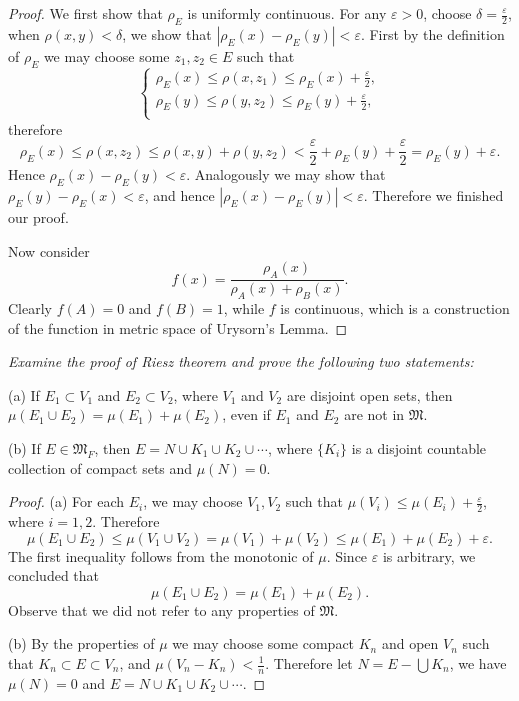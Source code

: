 \begin{proof}
We first show that $\rho_E$ is uniformly continuous. For any $\varepsilon>0$, choose $\delta=\frac{\varepsilon}{2}$, when $\rho(x,y)<\delta$, we show that $|\rho_E(x)-\rho_E(y)|<\varepsilon$. First by the definition of $\rho_E$ we may choose some $z_1,z_2\in E$ such that 
$$
\left\{ \begin{array}{c}
	\rho _E\left( x \right) \le \rho \left( x,z_1 \right) \le \rho _E\left( x \right) +\frac{\varepsilon}{2},\\
	\rho _E\left( y \right) \le \rho \left( y,z_2 \right) \le \rho _E\left( y \right) +\frac{\varepsilon}{2},\\
\end{array} \right. 
$$
therefore 
$$
\rho _E\left( x \right) \le \rho \left( x,z_2 \right) \le \rho \left( x,y \right) +\rho \left( y,z_2 \right) <\frac{\varepsilon}{2}+\rho _E\left( y \right) +\frac{\varepsilon}{2}=\rho _E\left( y \right) +\varepsilon .
$$
Hence $\rho_E(x)-\rho_E(y)<\varepsilon$. Analogously we may show that $\rho_E(y)-\rho_E(x)<\varepsilon$, and hence $|\rho_E(x)-\rho_E(y)|<\varepsilon$. Therefore we finished our proof.\par
Now consider 
$$f(x)=\frac{\rho_A(x)}{\rho_A(x)+\rho_B(x)}.$$
Clearly $f(A)=0$ and $f(B)=1$, while $f$ is continuous, which is a construction of the function in metric space of Urysorn's Lemma.
\end{proof}
\begin{problem}\em
Examine the proof of Riesz theorem and prove the following two statements:\par
(a) If $E_1\subset V_1$ and $E_2\subset V_2$, where $V_1$ and $V_2$ are disjoint open sets, then $\mu(E_1\cup E_2)=\mu(E_1)+\mu(E_2)$, even if $E_1$ and $E_2$ are not in $\mathfrak{M}$.\par
(b) If $E\in\mathfrak{M}_F$, then $E=N\cup K_1\cup K_2\cup\cdots$, where $\{K_i\}$ is a disjoint countable collection of compact sets and $\mu(N)=0$.
\end{problem}
\begin{proof}
(a) For each $E_i$, we may choose $V_1,V_2$ such that $\mu(V_i)\le\mu(E_i)+\frac{\varepsilon}{2}$, where $i=1,2$. Therefore 
$$
\mu \left( E_1\cup E_2 \right) \le \mu \left( V_1\cup V_2 \right) =\mu \left( V_1 \right) +\mu \left( V_2 \right) \le \mu \left( E_1 \right) +\mu \left( E_2 \right) +\varepsilon .
$$
The first inequality follows from the monotonic of $\mu$. Since $\varepsilon$ is arbitrary, we concluded that 
$$\mu(E_1\cup E_2)=\mu(E_1)+\mu(E_2).$$
Observe that we did not refer to any properties of $\mathfrak{M}$.\par
(b) By the properties of $\mu$ we may choose some compact $K_n$ and open $V_n$ such that $K_n\subset E\subset V_n$, and $\mu(V_n-K_n)<\frac{1}{n}$. Therefore let $N=E-\bigcup K_n$, we have $\mu(N)=0$ and $E=N\cup K_1\cup K_2\cup\cdots$.
\end{proof}
